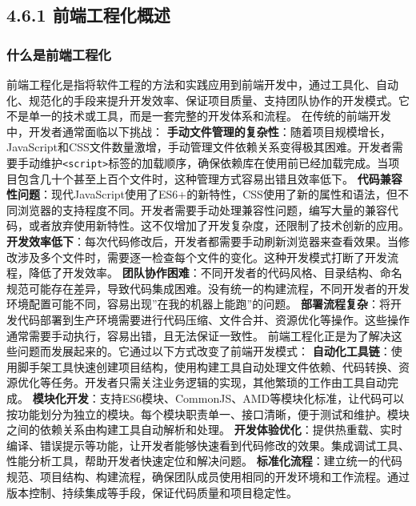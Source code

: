 \subsection{4.6.1 前端工程化概述}\label{ux524dux7aefux5de5ux7a0bux5316ux6982ux8ff0}
\subsubsection{什么是前端工程化}\label{ux4ec0ux4e48ux662fux524dux7aefux5de5ux7a0bux5316}
前端工程化是指将软件工程的方法和实践应用到前端开发中，通过工具化、自动化、规范化的手段来提升开发效率、保证项目质量、支持团队协作的开发模式。它不是单一的技术或工具，而是一套完整的开发体系和流程。 在传统的前端开发中，开发者通常面临以下挑战：
\textbf{手动文件管理的复杂性}：随着项目规模增长，JavaScript和CSS文件数量激增，手动管理文件依赖关系变得极其困难。开发者需要手动维护\texttt{<script>}标签的加载顺序，确保依赖库在使用前已经加载完成。当项目包含几十个甚至上百个文件时，这种管理方式容易出错且效率低下。
\textbf{代码兼容性问题}：现代JavaScript使用了ES6+的新特性，CSS使用了新的属性和语法，但不同浏览器的支持程度不同。开发者需要手动处理兼容性问题，编写大量的兼容代码，或者放弃使用新特性。这不仅增加了开发复杂度，还限制了技术创新的应用。
\textbf{开发效率低下}：每次代码修改后，开发者都需要手动刷新浏览器来查看效果。当修改涉及多个文件时，需要逐一检查每个文件的变化。这种开发模式打断了开发流程，降低了开发效率。
\textbf{团队协作困难}：不同开发者的代码风格、目录结构、命名规范可能存在差异，导致代码集成困难。没有统一的构建流程，不同开发者的开发环境配置可能不同，容易出现''在我的机器上能跑''的问题。
\textbf{部署流程复杂}：将开发代码部署到生产环境需要进行代码压缩、文件合并、资源优化等操作。这些操作通常需要手动执行，容易出错，且无法保证一致性。 前端工程化正是为了解决这些问题而发展起来的。它通过以下方式改变了前端开发模式：
\textbf{自动化工具链}：使用脚手架工具快速创建项目结构，使用构建工具自动处理文件依赖、代码转换、资源优化等任务。开发者只需关注业务逻辑的实现，其他繁琐的工作由工具自动完成。
\textbf{模块化开发}：支持ES6模块、CommonJS、AMD等模块化标准，让代码可以按功能划分为独立的模块。每个模块职责单一、接口清晰，便于测试和维护。模块之间的依赖关系由构建工具自动解析和处理。
\textbf{开发体验优化}：提供热重载、实时编译、错误提示等功能，让开发者能够快速看到代码修改的效果。集成调试工具、性能分析工具，帮助开发者快速定位和解决问题。
\textbf{标准化流程}：建立统一的代码规范、项目结构、构建流程，确保团队成员使用相同的开发环境和工作流程。通过版本控制、持续集成等手段，保证代码质量和项目稳定性。
